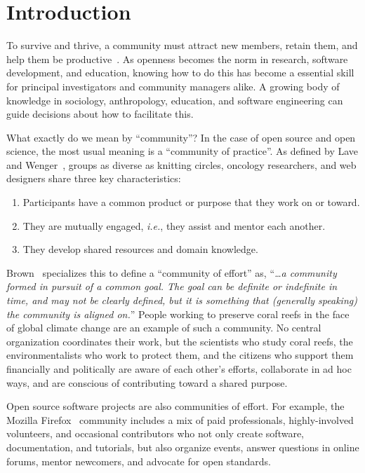 \documentclass[10pt,letterpaper]{article}
\begin{document}
\section*{Introduction}

To survive and thrive,
a community must attract new members,
retain them,
and help them be productive~\cite{qureshi2011}.
As openness becomes the norm in research, software development, and education,
knowing how to do this has become a essential skill
for principal investigators and community managers alike.
A growing body of knowledge in sociology, anthropology, education, and software engineering
can guide decisions about how to facilitate this.

What exactly do we mean by ``community''?
In the case of open source and open science,
the most usual meaning is a ``community of practice''.
As defined by Lave and Wenger~\cite{lave1991,wenger1999},
groups as diverse as knitting circles, oncology researchers, and web designers
share three key characteristics:

\begin{enumerate}

\item Participants have a common product or purpose that they work on or toward.

\item They are mutually engaged, \textit{i.e.}, they assist and mentor each another.

\item They develop shared resources and domain knowledge.

\end{enumerate}

Brown~\cite{brown2019} specializes this to define a ``community of effort'' as,
``\textit{{\ldots}a community formed in pursuit of a common goal.
The goal can be definite or indefinite in time,
and may not be clearly defined,
but it is something that (generally speaking) the community is aligned on.}''
People working to preserve coral reefs in the face of global climate change
are an example of such a community.
No central organization coordinates their work,
but the scientists who study coral reefs,
the environmentalists who work to protect them,
and the citizens who support them financially and politically
are aware of each other's efforts,
collaborate in ad hoc ways,
and are conscious of contributing toward a shared purpose.

Open source software projects are also communities of effort.
For example,
the Mozilla Firefox~\cite{mozilla} community includes a mix of paid professionals,
highly-involved volunteers,
and occasional contributors who not only create software,
documentation,
and tutorials,
but also organize events,
answer questions in online forums,
mentor newcomers,
and advocate for open standards.
\end{document}
